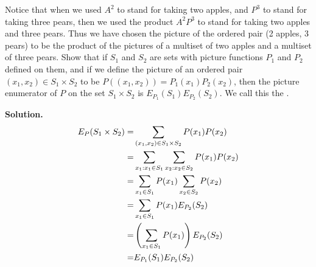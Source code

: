 \documentclass{book}
\begin{document}
\setcounter{project}{240}
\addtocounter{project}{-1}
\begin{activity}[]\label{activity-233}
\hypertarget{p-1319}{}%
Notice that when we used \(A^2\) to stand for taking two apples, and \(P^3\) to stand for taking three pears, then we used the product \(A^2P^3\) to stand for taking two apples and three pears. Thus we have chosen the picture of the ordered pair (2 apples, 3 pears) to be the product of the pictures of a multiset of two apples and a multiset of three pears. Show that if \(S_1\) and \(S_2\) are sets with picture functions \(P_1\) and \(P_2\) defined on them, and if we define the picture of an ordered pair \((x_1,x_2)\in S_1\times S_2\) to be \(P((x_1,x_2))= P_1(x_1)P_2(x_2)\), then the picture enumerator of \(P\) on the set \(S_1\times S_2\) is \(E_{P_1}(S_1)E_{P_2}(S_2)\). We call this the .%
\par\smallskip%
\noindent\textbf{Solution.}\hypertarget{solution-166}{}\quad%
\hypertarget{p-1320}{}%
%
\begin{align*}
E_P(S_1\times S_2) =& \sum_{(x_1,x_2)\in S_1\times
S_2} P(x_1)P(x_2)\\
=&
\sum_{x_1:x_1\in S_1}\sum_{x_2:x_2\in S_2} P(x_1)P(x_2)\\
=& \sum_{x_1\in S_1}P(x_1)\sum_{x_2\in S_2}P(x_2)\\
=& \sum_{x_1\in S_1} P(x_1) E_{P_2}(S_2)\\
=& \left(\sum_{x_1\in S_1} P(x_1)\right)E_{P_2}(S_2)\\
=& E_{P_1}(S_1)E_{P_2}(S_2)
\end{align*}
%
\end{activity}
\end{document}
